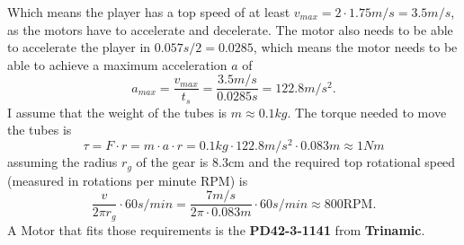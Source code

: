 \noindent Which means the player has a top speed of at least $v_{max}=2\cdot1.75m/s=3.5m/s$, as the motors have to accelerate and decelerate.
The motor also needs to be able to accelerate the player in $0.057s/2=0.0285$, which means the motor needs to be able to achieve a maximum acceleration $a$ of
\begin{equation}
    \label{eq:acceleration}
    a_{max} = \frac{v_{max}}{t_s} = \frac{3.5m/s}{0.0285s} = 122.8m/s^2.
\end{equation}
I assume that the weight of the tubes is $m \approx 0.1kg$.
The torque needed to move the tubes is
\begin{equation}
    \label{eq:torque}
    \tau = F \cdot r = m \cdot a \cdot r = 0.1kg \cdot 122.8m/s^2 \cdot 0.083m \approx 1Nm
\end{equation}
assuming the radius $r_g$ of the gear is 8.3cm and the required top rotational speed (measured in rotations per minute $\text{RPM}$) is
\begin{equation}
    \label{eq:top_rpm}
    \frac{v}{2\pi r_g} \cdot 60s/min = \frac{7m/s}{2\pi \cdot 0.083m} \cdot 60s/min \approx 800\text{RPM}.
\end{equation}
A Motor that fits those requirements is the \textbf{PD42-3-1141\autocite{PD42-3-1141}} from \textbf{Trinamic}.

